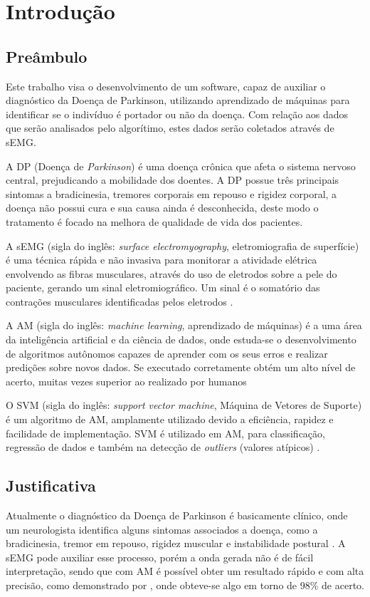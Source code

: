 \chapter[Introdução]{Introdução} 
\section{Preâmbulo} 
Este trabalho visa o desenvolvimento de um software, capaz de auxiliar o diagnóstico da Doença de Parkinson, utilizando aprendizado de máquinas para identificar se o indivíduo é portador ou não da doença. Com relação aos dados que serão analisados pelo algorítimo, estes dados serão coletados através de sEMG. 

A DP (Doença de \textit{Parkinson}) é uma doença crônica que afeta o sistema nervoso central, prejudicando a mobilidade dos doentes. A DP possue três principais sintomas a bradicinesia, tremores corporais em repouso e rigidez corporal, a doença não possui cura e sua causa ainda é desconhecida, deste modo o tratamento é focado na melhora de qualidade de vida dos pacientes\cite{da2016aspectos}. 

A sEMG (sigla do inglês: \textit{surface electromyography}, eletromiografia de superfície) é uma técnica rápida e não invasiva para monitorar a atividade elétrica envolvendo as fibras musculares, através do uso de eletrodos sobre a pele do paciente, gerando um sinal eletromiográfico. Um sinal é o somatório das contrações musculares identificadas pelos eletrodos \cite{de2010eletromiografia}. 

A AM (sigla do inglês: \textit{machine learning}, aprendizado de máquinas) é a uma área da inteligência artificial e da ciência de dados, onde estuda-se o desenvolvimento de algoritmos autônomos capazes de aprender com os seus erros e realizar predições sobre novos dados. Se executado corretamente obtém um alto nível de acerto, muitas vezes superior ao realizado por humanos \cite{Kohavi} 

O SVM (sigla do inglês: \textit{support vector machine}, Máquina de Vetores de Suporte) é um algoritmo de AM, amplamente utilizado devido a eficiência, rapidez e facilidade de implementação. SVM é utilizado em AM, para classificação, regressão de dados e também na detecção de \textit{outliers} (valores atípicos) \cite{scikit-learn}. 

\section{Justificativa} 
Atualmente o diagnóstico da Doença de Parkinson é basicamente clínico, onde um neurologista identifica alguns sintomas associados a doença, como a bradicinesia, tremor em repouso, rigidez muscular e instabilidade postural \cite{gago2014manual}. A sEMG pode auxiliar esse processo, porém a onda gerada não é de fácil interpretação, sendo que com AM é possível obter um resultado rápido e com alta precisão, como demonstrado por , onde obteve-se algo em torno de 98\% de acerto. 

